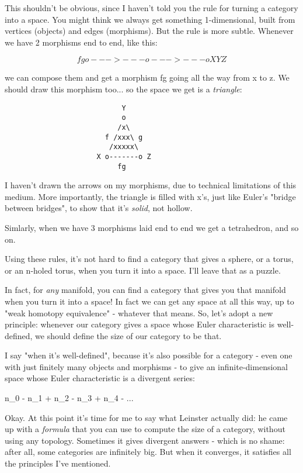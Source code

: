 This shouldn't be obvious, since I haven't told you the rule for turning 
a category into a space.  You might think we always get something 
1-dimensional, built from vertices (objects) and edges (morphisms).  
But the rule is more subtle.  Whenever we have 2 morphisms end to end, 
like this:

$$
                        f       g
                    o--->---o--->---o
                    X       Y       Z
$$
    

we can compose them and get a morphism fg going all the way from x to
z.  We should draw this morphism too... so the space we get is a
\emph{triangle}:

\begin{verbatim}
                            Y
                            o
                           /x\
                        f /xxx\ g
                         /xxxxx\
                      X o-------o Z
                           fg
\end{verbatim}
    
I haven't drawn the arrows on my morphisms, due to technical limitations 
of this medium.  More importantly, the triangle is filled with x's, just 
like Euler's "bridge between bridges", to show that it's 
\emph{solid}, not hollow.

Simlarly, when we have 3 morphisms laid end to end we get a tetrahedron,
and so on.

Using these rules, it's not hard to find a category that gives a sphere, 
or a torus, or an n-holed torus, when you turn it into a space.  I'll 
leave that as a puzzle.  


In fact, for \emph{any} manifold, you can find a category that gives
you that manifold when you turn it into a space!  In fact we can get
any space at all this way, up to "weak homotopy equivalence" -
whatever that means.  So, let's adopt a new principle: whenever our
category gives a space whose Euler characteristic is well-defined, we
should define the size of our category to be that.

I say "when it's well-defined", because it's also possible
for a category - even one with just finitely many objects and
morphisms - to give an infinite-dimensional space whose Euler
characteristic is a divergent series:

n_{0} - n_{1} + n_{2} - n_{3} +
n_{4} - ...

Okay.  At this point it's time for me to say what Leinster actually
did: he came up with a \emph{formula} that you can use to compute
the size of a category, without using any topology.  Sometimes it
gives divergent answers - which is no shame: after all, some
categories are infinitely big.  But when it converges, it satisfies
all the principles I've mentioned.

